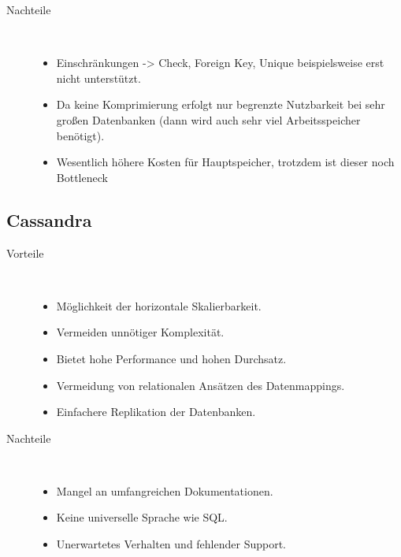 \documentclass[a4paper, 12pt]{scrartcl}
\begin{document}
\begin{description}
	\item[Nachteile]~\par
	\begin{itemize}
		\item Einschränkungen -> Check, Foreign Key, Unique beispielsweise erst nicht unterstützt.
		\item Da keine Komprimierung erfolgt nur begrenzte Nutzbarkeit bei sehr großen Datenbanken (dann wird auch sehr viel Arbeitsspeicher benötigt).
		\item Wesentlich höhere Kosten für Hauptspeicher, trotzdem ist dieser noch Bottleneck



	\end{itemize}
\end{description}

\subsection{Cassandra}

\begin{description}
	\item[Vorteile]~\par
	\begin{itemize}
		\item Möglichkeit der horizontale Skalierbarkeit.
		\item Vermeiden unnötiger Komplexität.
		\item Bietet hohe Performance und hohen Durchsatz.
		\item Vermeidung von relationalen Ansätzen des Datenmappings.
		\item Einfachere Replikation der Datenbanken. 

	\end{itemize}
\end{description}


\begin{description}
	\item[Nachteile]~\par
	\begin{itemize}
		\item Mangel an umfangreichen Dokumentationen. 
		\item Keine universelle Sprache wie SQL. 
		\item Unerwartetes Verhalten und fehlender Support. 
		
	\end{itemize}
\end{description}
\end{document}
